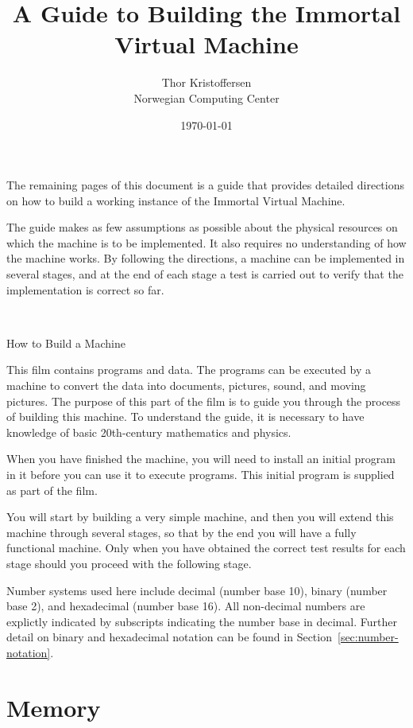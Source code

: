\documentclass[a4paper,12pt]{article}
\author{Thor Kristoffersen\\Norwegian Computing Center}
\date{\today}
\title{A Guide to Building the Immortal Virtual Machine}
\theoremstyle{definition}
\begin{document}
\maketitle

\noindent
The remaining pages of this document is a guide that provides detailed directions on how to build a working instance of the Immortal Virtual Machine.

The guide makes as few assumptions as possible about the physical resources on which the machine is to be implemented.
It also requires no understanding of how the machine works.
By following the directions, a machine can be implemented in several stages, and at the end of each stage a test is carried out to verify that the implementation is correct so far.

\thispagestyle{empty}
\newpage

~
\thispagestyle{empty}
\newpage
\setcounter{page}{1}

\begin{center}
  \Large{How to Build a Machine}
\end{center}
\vspace{1em}

\noindent
This film contains programs and data.
The programs can be executed by a machine to convert the data into documents, pictures, sound, and moving pictures.
The purpose of this part of the film is to guide you through the process of building this machine.
To understand the guide, it is necessary to have knowledge of basic 20th-century mathematics and physics.

When you have finished the machine, you will need to install an initial program in it before you can use it to execute programs.
This initial program is supplied as part of the film.

You will start by building a very simple machine, and then you will extend this machine through several stages, so that by the end you will have a fully functional machine.
Only when you have obtained the correct test results for each stage should you proceed with the following stage.

Number systems used here include decimal (number base 10), binary (number base 2), and hexadecimal (number base 16).
All non-decimal numbers are explictly indicated by subscripts indicating the number base in decimal.
Further detail on binary and hexadecimal notation can be found in Section~\ref{sec:number-notation}.

\section{Memory}
\end{document}
